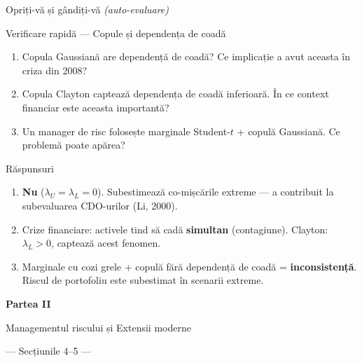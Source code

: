 \documentclass[9pt, aspectratio=169, t]{beamer}
\theoremstyle{definition}
\begin{document}
\begin{frame}{Opriți-vă și gândiți-vă \hfill {\normalsize\textcolor{MediumGray}{\textit{(auto-evaluare)}}}}
\begin{alertblock}{Verificare rapidă --- Copule și dependența de coadă}
\begin{enumerate}\setlength\itemsep{4pt}
\item Copula Gaussiană are dependență de coadă? Ce implicație a avut aceasta în criza din 2008?
\item Copula Clayton captează dependența de coadă inferioară. În ce context financiar este aceasta importantă?
\item Un manager de risc folosește marginale Student-$t$ + copulă Gaussiană. Ce problemă poate apărea?
\end{enumerate}
\end{alertblock}
\vspace{0.2cm}
\begin{exampleblock}{Răspunsuri}
\begin{enumerate}\setlength\itemsep{1pt}
\item \textbf{Nu} ($\lambda_U = \lambda_L = 0$). Subestimează co-mișcările extreme --- a contribuit la subevaluarea CDO-urilor (Li, 2000).
\item Crize financiare: activele tind să cadă \textbf{simultan} (contagiune). Clayton: $\lambda_L > 0$, captează acest fenomen.
\item Marginale cu cozi grele + copulă fără dependență de coadă = \textbf{inconsistență}. Riscul de portofoliu este subestimat în scenarii extreme.
\end{enumerate}
\end{exampleblock}
\end{frame}

{
\begin{frame}[plain]
\vfill
\begin{center}
{\Huge\textcolor{IDAred}{\textbf{Partea II}}}

\vspace{0.6cm}

{\Large\textcolor{MainBlue}{Managementul riscului și Extensii moderne}}

\vspace{0.4cm}

{\large\textcolor{MediumGray}{--- Secțiunile 4--5 ---}}
\end{center}
\vfill
\end{frame}
}
\end{document}
